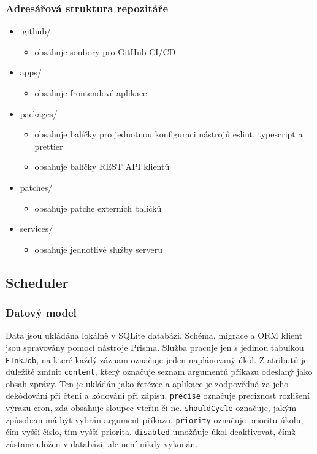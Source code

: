 \subsubsection{Adresářová struktura repozitáře}
\begin{itemize}
    \item .github/
        \begin{itemize}
            \item obsahuje soubory pro GitHub CI/CD
        \end{itemize}
    \item apps/
        \begin{itemize}
            \item obsahuje frontendové aplikace
        \end{itemize}
    \item packages/
        \begin{itemize}
            \item obsahuje balíčky pro jednotnou konfiguraci nástrojů eslint, typescript a prettier
            \item obsahuje balíčky REST API klientů
        \end{itemize}
    \item patches/
        \begin{itemize}
            \item obsahuje patche externích balíčků
        \end{itemize}
    \item services/
        \begin{itemize}
            \item obsahuje jednotlivé služby serveru
        \end{itemize}
\end{itemize}

\subsection{Scheduler}
\subsubsection{Datový model}
Data jsou ukládána lokálně v SQLite databázi. Schéma, migrace a ORM klient jsou spravovány pomocí nástroje Prisma. Služba pracuje jen s jedinou tabulkou \lstinline|EInkJob|, na které každý záznam označuje jeden naplánovaný úkol. Z atributů je důležité zmínit \lstinline|content|, který označuje seznam argumentů příkazu odeslaný jako obsah zprávy. Ten je ukládán jako řetězec a aplikace je zodpovědná za jeho dekódování při čtení a kódování při zápisu. \lstinline|precise| označuje preciznost rozlišení výrazu cron, zda obsahuje sloupec vteřin či ne. \lstinline|shouldCycle| označuje, jakým způsobem má být vybrán argument příkazu. \lstinline|priority| označuje prioritu úkolu, čím vyšší číslo, tím vyšší priorita. \lstinline|disabled| umožňuje úkol deaktivovat, čímž zůstane uložen v databázi, ale není nikdy vykonán.

